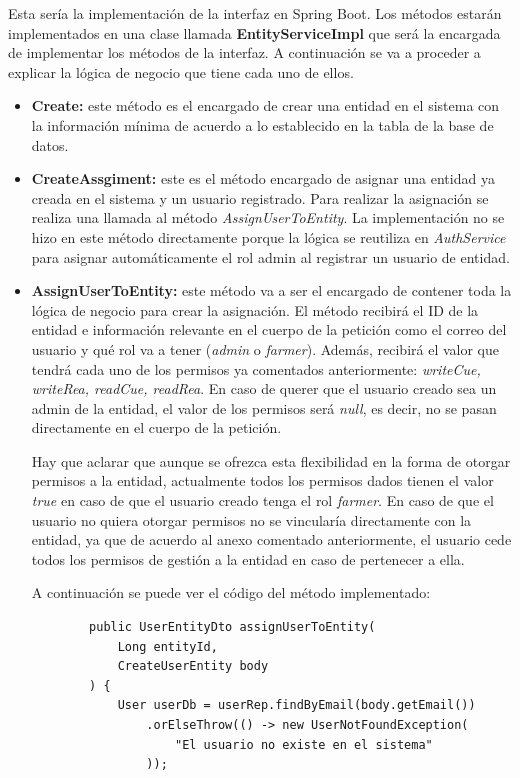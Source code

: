 Esta sería la implementación de la interfaz en Spring Boot. Los métodos estarán implementados en una clase llamada \textbf{EntityServiceImpl} que será la encargada de implementar
los métodos de la interfaz. A continuación se va a proceder a explicar la lógica de negocio que tiene cada uno de ellos.

\begin{itemize}
    \item \textbf{Create:} este método es el encargado de crear una entidad en el sistema con la información mínima de acuerdo a lo establecido en la tabla de la base de datos.
    
    \item \textbf{CreateAssgiment:} este es el método encargado de asignar una entidad ya creada en el sistema y un usuario registrado. Para realizar la asignación
    se realiza una llamada al método \textit{AssignUserToEntity}. La implementación no se hizo en este método directamente porque la lógica se reutiliza en \textit{AuthService} 
    para asignar automáticamente el rol admin al registrar un usuario de entidad.  

    \item \textbf{AssignUserToEntity:} este método va a ser el encargado de contener toda la lógica de negocio para crear la asignación. El método recibirá el ID de la entidad e 
    información relevante en el cuerpo de la petición como el correo del usuario y qué rol va a tener (\textit{admin} o \textit{farmer}). Además, recibirá el valor que tendrá cada uno
    de los permisos ya comentados anteriormente: \textit{writeCue, writeRea, readCue, readRea}. En caso de querer que el usuario creado sea un admin de la entidad, el valor de los 
    permisos será \textit{null}, es decir, no se pasan directamente en el cuerpo de la petición.

    Hay que aclarar que aunque se ofrezca esta flexibilidad en la forma de otorgar permisos a la entidad, actualmente todos los permisos dados tienen el valor \textit{true} en caso
    de que el usuario creado tenga el rol \textit{farmer}. En caso de que el usuario no quiera otorgar permisos no se vincularía directamente con la entidad, ya que de acuerdo al anexo
    comentado anteriormente, el usuario cede todos los permisos de gestión a la entidad en caso de pertenecer a ella.
    
    A continuación se puede ver el código del método implementado:

    \begin{verbatim}
        public UserEntityDto assignUserToEntity(
            Long entityId, 
            CreateUserEntity body
        ) {
            User userDb = userRep.findByEmail(body.getEmail())
                .orElseThrow(() -> new UserNotFoundException(
                    "El usuario no existe en el sistema"
                ));


\end{verbatim}
\end{itemize}
